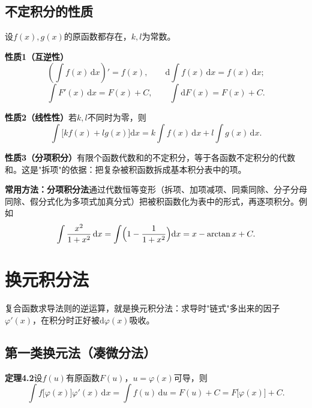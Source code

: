 
\subsection{不定积分的性质}

设$f(x),g(x)$的原函数都存在，$k,l$为常数。

\noindent\textbf{性质1（互逆性）}
\[
\left(\int f(x)\,\mathrm{d}x\right)'=f(x),\qquad \mathrm{d}\int f(x)\,\mathrm{d}x=f(x)\,\mathrm{d}x;
\]
\[
\int F'(x)\,\mathrm{d}x=F(x)+C,\qquad \int \mathrm{d}F(x)=F(x)+C.
\]

\noindent\textbf{性质2（线性性）}\quad 若$k,l$不同时为零，则
\[
\int\bigl[kf(x)+lg(x)\bigr]\mathrm{d}x=k\int f(x)\,\mathrm{d}x+l\int g(x)\,\mathrm{d}x.
\]

\noindent\textbf{性质3（分项积分）}\quad 有限个函数代数和的不定积分，等于各函数不定积分的代数和。这是"拆项"的依据：把复杂被积函数拆成基本积分表中的项。

\noindent\textbf{常用方法：分项积分法}\quad 通过代数恒等变形（拆项、加项减项、同乘同除、分子分母同除、假分式化为多项式加真分式）把被积函数化为表中的形式，再逐项积分。例如
\[
\int\frac{x^2}{1+x^2}\,\mathrm{d}x=\int\Bigl(1-\frac{1}{1+x^2}\Bigr)\mathrm{d}x=x-\arctan x+C .
\]


\section{换元积分法}

复合函数求导法则的逆运算，就是换元积分法：求导时"链式"多出来的因子$\varphi'(x)$，在积分时正好被$\mathrm{d}\varphi(x)$吸收。

\subsection{第一类换元法（凑微分法）}

\noindent\textbf{定理4.2}\quad 设$f(u)$有原函数$F(u)$，$u=\varphi(x)$可导，则
\[
\int f\bigl[\varphi(x)\bigr]\varphi'(x)\,\mathrm{d}x=\int f(u)\,\mathrm{d}u=F(u)+C=F\bigl[\varphi(x)\bigr]+C .
\]

